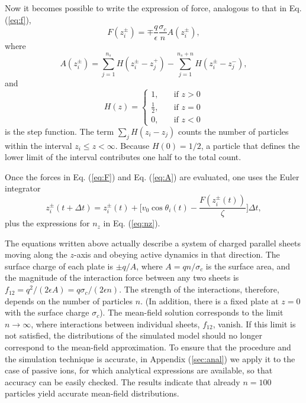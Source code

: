 \documentclass[pre,twocolumn,graphicx]{revtex4-1}
\newcommand{\be}{\begin{equation}}
\newcommand{\ee}{\end{equation}}
\begin{document}
Now it becomes possible to write the expression of force, analogous to that in Eq. (\ref{eq:f}), 
\be
F(z_i^{\pm}) =  \mp\frac{q}{\epsilon} \frac{\sigma_c}{n} A(z_i^{\pm}), 
\label{eq:F}
\ee
where 
\be
A(z_i^{\pm}) = \sum_{j=1}^{n_s} H(z_i^{\pm}-z_j^+) - \sum_{j=1}^{n_s+n} H(z_i^{\pm}-z_j^-),
\label{eq:A}
\ee
and
\be
H(z) = \left\{ 
  \begin{array}{ccc}
     1, & \quad \text{if $z>0$}\\
     \frac{1}{2}, & \quad \text{if $z= 0$}\\
     0, & \quad \text{if $z< 0$}
        \label{eq:H}
  \end{array} 
  \right.
  \ee
is the step function.  The term $\sum_{j} H(z_i-z_j)$ counts the number of particles within the interval 
$z_i\le z<\infty$.  Because $H(0)=1/2$, a particle that defines the lower limit of the interval 
contributes one half to the total count.  

Once the forces in Eq. (\ref{eq:F}) and Eq. (\ref{eq:A}) are evaluated, one uses the Euler integrator
\be
z_i^{\pm}(t+\Delta t) = z_i^{\pm}(t) + \bigg[ v_0 \cos\theta_i(t) - \frac{F(z_i^{\pm}(t))}{\zeta}\bigg] \Delta t,
\ee
plus the expressions for $n_z$ in Eq. (\ref{eq:nz}). 



The equations written above actually describe a system of charged parallel sheets moving along 
the $z$-axis and obeying active dynamics in that direction.  The surface charge of each plate is 
$\pm q/A$, where $A=q n/\sigma_c$ is the surface area, and the magnitude of the interaction force 
between any two sheets is $f_{12}=q^2/(2\epsilon A)=q\sigma_c/(2\epsilon n)$.  The strength of the 
interactions, therefore, depends on the number of particles $n$.  (In addition, there is a fixed plate 
at $z=0$ with the surface charge $\sigma_c$).  The mean-field solution  
corresponds to the limit 
$n\to\infty$, where interactions between individual sheets, $f_{12}$, vanish.  If this limit is not satisfied, 
the distributions of the simulated model should no longer correspond to the mean-field approximation.  
To ensure that the procedure and the simulation technique 
is accurate, in Appendix (\ref{sec:anal}) we apply it to the case of passive ions, for which 
analytical expressions are available, so that accuracy can be easily checked.  
The results indicate that already $n=100$ particles
yield accurate mean-field distributions.    
\end{document}
